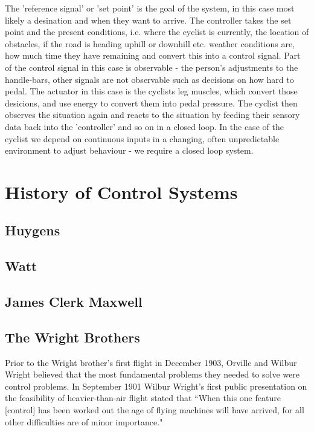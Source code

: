 The 'reference signal' or 'set point' is the goal of the system, in this case most likely a
desination and when they want to arrive. The controller takes the set point and the present
conditions, i.e. where the cyclist is currently, the location of obstacles, if the road is heading
uphill or downhill etc.  weather conditions are, how much time they have remaining and convert this
into a control signal. Part of the control signal in this case is observable - the person's
adjustments to the handle-bars, other signals are not observable such as decisions on how hard to
pedal. The actuator in this case is the cyclists leg muscles, which convert those desicions, and use
energy to convert them into pedal pressure. The cyclist then observes the situation again and reacts
to the situation by feeding their sensory data back into the 'controller' and so on in a closed
loop. In the case of the cyclist we depend on continuous inputs in a changing, often unpredictable
environment to adjust behaviour - we require a closed loop system.

\section{History of Control Systems} 

\subsection{Huygens}

\subsection{Watt}

\subsection{James Clerk Maxwell}

\subsection{The Wright Brothers}

Prior to the Wright brother's first flight in December 1903, Orville and Wilbur Wright believed that
the most fundamental problems they needed to solve were control problems. In September 1901 Wilbur
Wright's first public presentation on the feasibility of heavier-than-air flight stated that ``When
this one feature [control] has been worked out the age of flying machines will have arrived, for all
other difficulties are of minor importance."\cite{wright1908}

